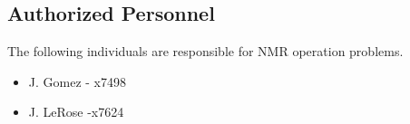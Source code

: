 \subsection{Authorized Personnel}
The following individuals are responsible for NMR operation problems.

\begin{itemize} 
\item[~]J. Gomez - x7498 
\item[~]J. LeRose -x7624
\end{itemize} 

%
%
%
%
%
